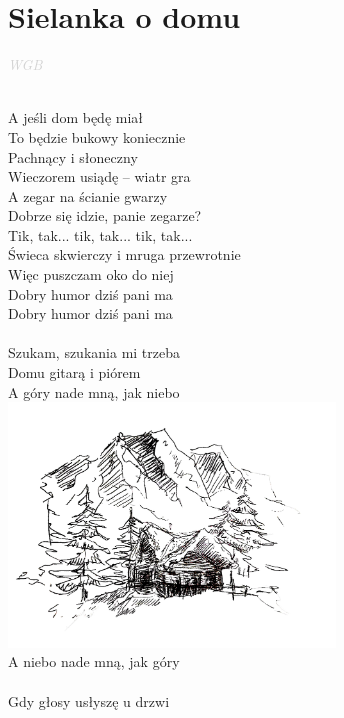 \documentclass[a5paper, 10pt]{book}
\begin{document}
\section{Sielanka o domu}\textcolor{lightgray}{\textit{WGB}}\\~\\
\begin{minipage}[t]{0.65\textwidth}
A jeśli dom będę miał\\
To będzie bukowy koniecznie\\
Pachnący i słoneczny\\
Wieczorem usiądę – wiatr gra\\
A zegar na ścianie gwarzy\\
Dobrze się idzie, panie zegarze?\\
Tik, tak... tik, tak... tik, tak...\\
Świeca skwierczy i mruga przewrotnie\\
Więc puszczam oko do niej\\
Dobry humor dziś pani ma\\
Dobry humor dziś pani ma\\
\\
\hspace*{6mm}Szukam, szukania mi trzeba\\
\hspace*{6mm}Domu gitarą i piórem\\
\hspace*{6mm}A góry nade mną, jak niebo\\
\hspace*{5.5cm}\includegraphics[height=6.5cm]{images/sielanka_o_domu.png}\vspace*{-6.6cm}\\
\hspace*{6mm}A niebo nade mną, jak góry\\
\\
Gdy głosy usłyszę u drzwi\\

\end{minipage}
\end{document}
